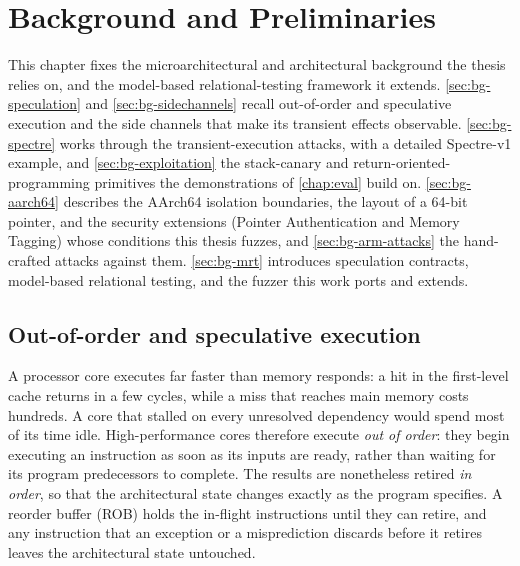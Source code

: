 \chapter{Background and Preliminaries}
\label{chap:background}

This chapter fixes the microarchitectural and architectural background the thesis relies on,
and the model-based relational-testing framework it extends.
\autoref{sec:bg-speculation} and \autoref{sec:bg-sidechannels} recall out-of-order and
speculative execution and the side channels that make its transient effects observable.
\autoref{sec:bg-spectre} works through the transient-execution attacks, with a detailed
Spectre-v1 example, and \autoref{sec:bg-exploitation} the stack-canary and
return-oriented-programming primitives the demonstrations of \autoref{chap:eval} build on.
\autoref{sec:bg-aarch64} describes the AArch64 isolation boundaries, the
layout of a 64-bit pointer, and the security extensions (Pointer Authentication and Memory
Tagging) whose conditions this thesis fuzzes, and \autoref{sec:bg-arm-attacks} the
hand-crafted attacks against them. \autoref{sec:bg-mrt} introduces speculation contracts,
model-based relational testing, and the \revizor{} fuzzer this work ports and extends.

\section{Out-of-order and speculative execution}
\label{sec:bg-speculation}

A processor core executes far faster than memory responds: a hit in the first-level cache
returns in a few cycles, while a miss that reaches main memory costs hundreds. A core that
stalled on every unresolved dependency would spend most of its time idle. High-performance cores
therefore execute \emph{out of order}: they begin executing an instruction as soon as its inputs are
ready, rather than waiting for its program predecessors to complete. The results are nonetheless
retired \emph{in order}, so that the architectural state changes exactly as the program specifies.
A reorder buffer (ROB) holds the in-flight instructions until they can retire, and any instruction
that an exception or a misprediction discards before it retires leaves the architectural state
untouched.


